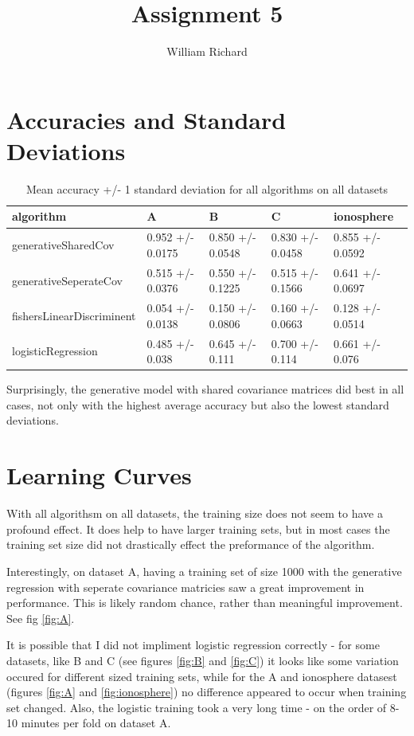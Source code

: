 \documentclass[12pt]{article}
\begin{document}
\title{Assignment 5}
\author{William Richard}
\maketitle

\section{Accuracies and Standard Deviations}

\begin{table}[ht]
\begin{tabular}{l || p{2cm} | p{2cm} | p{2cm} |  p{2cm}}
algorithm& A& B& C& ionosphere\\
\hline
\hline
generativeSharedCov & 0.952 +/- 0.0175& 0.850 +/- 0.0548& 0.830 +/- 0.0458& 0.855 +/- 0.0592\\
\hline
generativeSeperateCov& 0.515 +/- 0.0376& 0.550 +/- 0.1225& 0.515 +/- 0.1566& 0.641 +/- 0.0697\\
\hline
fishersLinearDiscriminent& 0.054 +/- 0.0138& 0.150 +/- 0.0806& 0.160 +/- 0.0663& 0.128 +/- 0.0514\\
\hline
logisticRegression& 0.485 +/- 0.038& 0.645 +/- 0.111& 0.700 +/- 0.114& 0.661 +/- 0.076\\ 
\end{tabular}
\label{tab:accStdDev}
\caption{Mean accuracy +/- 1 standard deviation for all algorithms on all datasets}
\end{table}

Surprisingly, the generative model with shared covariance matrices did best in all cases, not only with the highest average accuracy but also the lowest standard deviations.  

\section{Learning Curves}

With all algorithsm on all datasets, the training size does not seem to have a profound effect.  It does help to have larger training sets, but in most cases the training set size did not drastically effect the preformance of the algorithm.

Interestingly, on dataset A, having a training set of size 1000 with the generative regression with seperate covariance matricies saw a great improvement in performance.  This is likely random chance, rather than meaningful improvement.  See fig \ref{fig:A}.

It is possible that I did not impliment logistic regression correctly - for some datasets, like B and C (see figures \ref{fig:B} and \ref{fig:C}) it looks like some variation occured for different sized training sets, while for the A and ionosphere datasest (figures \ref{fig:A} and \ref{fig:ionosphere}) no difference appeared to occur when training set changed.  Also, the logistic training  took a very long time - on the order of 8-10 minutes per fold on dataset A.
\end{document}
